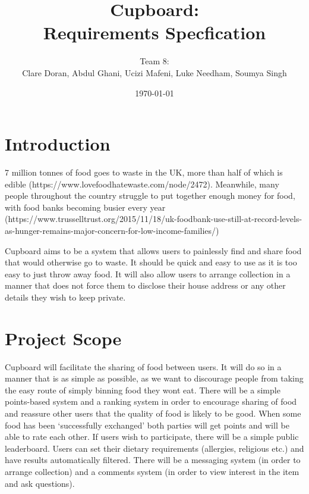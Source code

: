 \documentclass[12pt]{article}
\title{Cupboard:\\Requirements Specfication}
\author{Team 8:\\Clare Doran, Abdul Ghani, Ucizi Mafeni, Luke Needham, Soumya Singh}
\date{\today}
\begin{document}
\maketitle

\tableofcontents
\clearpage
\section{Introduction}
7 million tonnes of food goes to waste in the UK, more than half of which is 
edible (https://www.lovefoodhatewaste.com/node/2472).
Meanwhile,  many people throughout the country struggle to put together enough 
money for food, with food banks becoming busier every year
(https://www.trusselltrust.org/2015/11/18/uk-foodbank-use-still-at-record-levels-as-hunger-remains-major-concern-for-low-income-families/)

Cupboard aims to be a system that allows users to painlessly find and share food
that would otherwise go to waste. It should be quick and easy to use as it is
too easy to just throw away food. 
It will also allow users to arrange collection in a manner that does not force
them to disclose their house address or any other details they wish to keep
private.


\section{Project Scope}
Cupboard will facilitate the sharing of food between users. It will do so in a
manner that is as simple as possible, as we want to discourage people from
taking the easy route of simply binning food they wont eat.
There will be a simple points-based system and a ranking system in order to
encourage sharing of food and reassure other users that the quality of food is
likely to be good. When some food has been ‘successfully exchanged’ both
parties will get points and will be able to rate each other. If users wish to
participate, there will be a simple public leaderboard.
Users can set their dietary requirements (allergies, religious etc.) and have
results automatically filtered. 
There will be a messaging system (in order to arrange collection) and a comments
system (in order to view interest in the item and ask questions).
\end{document}
